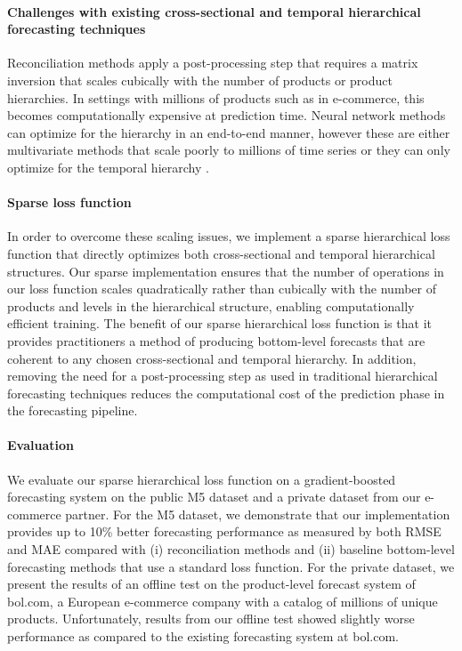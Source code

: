 \documentclass[preprint, 3p, times, twocolumn]{elsarticle}
\begin{document}
\paragraph{Challenges with existing cross-sectional and temporal hierarchical forecasting techniques} Reconciliation methods \cite{hyndman_optimal_2011,athanasopoulos_forecasting_2017,wickramasuriya_optimal_2019} apply a post-processing step that requires a matrix inversion that scales cubically with the number of products or product hierarchies. In settings with millions of products such as in e-commerce, this becomes computationally expensive at prediction time. Neural network methods can optimize for the hierarchy in an end-to-end manner, however these are either multivariate methods that scale poorly to millions of time series \cite{rangapuram_endtoend_2021} or they can only optimize for the temporal hierarchy \cite{rangapuram_coherent_2023}.
  
\paragraph{Sparse loss function} In order to overcome these scaling issues, we implement a sparse hierarchical loss function that directly optimizes both cross-sectional and temporal hierarchical structures. Our sparse implementation ensures that the number of operations in our loss function scales quadratically rather than cubically with the number of products and levels in the hierarchical structure, enabling computationally efficient training. The benefit of our sparse hierarchical loss function is that it provides practitioners a method of producing bottom-level forecasts that are coherent to any chosen cross-sectional and temporal hierarchy. In addition, removing the need for a post-processing step as used in traditional hierarchical forecasting techniques reduces the computational cost of the prediction phase in the forecasting pipeline.

\paragraph{Evaluation} We evaluate our sparse hierarchical loss function on a gradient-boosted forecasting system on the public M5 dataset \cite{makridakis_m5_2022} and a private dataset from our e-commerce partner. For the M5 dataset, we demonstrate that our implementation provides up to 10\% better forecasting performance as measured by both RMSE and MAE compared with (i) reconciliation methods and (ii) baseline bottom-level forecasting methods that use a standard loss function. For the private dataset, we present the results of an offline test on the product-level forecast system of bol.com, a European e-commerce company with a catalog of millions of unique products. Unfortunately, results from our offline test showed slightly worse performance as compared to the existing forecasting system at bol.com.
\end{document}
